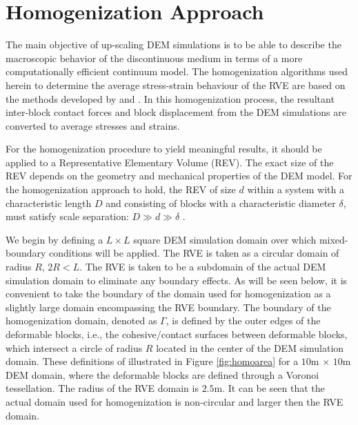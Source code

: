 \section{Homogenization Approach}

The main objective of up-scaling DEM simulations is to be able to describe the macroscopic behavior of the discontinuous medium in terms of a more computationally efficient continuum model. The homogenization algorithms used herein to determine the average stress-strain behaviour of the RVE are based on the methods developed by \citet{daddetta_particle_2004} and \citet{wellmann_homogenization_2008}. In this homogenization process, the resultant inter-block contact forces and block displacement from the DEM simulations are converted to average stresses and strains.

For the homogenization procedure to yield meaningful results, it should be applied to a Representative Elementary Volume (REV). The exact size of the REV depends on the geometry and mechanical properties of the DEM model. For the homogenization approach to hold, the REV of size $d$ within a system with a characteristic length $D$ and consisting of blocks with a characteristic diameter $\delta$, must satisfy scale separation: $D\gg d\gg\delta$ \citep{wellmann_homogenization_2008}. 

We begin by defining a $L\times L$ square DEM simulation domain over which mixed-boundary conditions will be applied. The RVE is taken as a circular domain of radius $R$, $2R<L$.  The RVE is taken to be a subdomain of the actual DEM simulation domain to eliminate any boundary effects.  As will be seen below, it is convenient to take the boundary of the domain used for homogenization as a slightly large domain encompassing the RVE boundary. The boundary of the homogenization domain, denoted as $\Gamma$, is defined by the outer edges of the deformable blocks, i.e., the cohesive/contact surfaces between deformable blocks, which intersect a circle of radius $R$ located in the center of the DEM simulation domain. These definitions of illustrated in Figure \ref{fig:homoarea} for a $10$m $\times$ $10$m DEM domain, where the deformable blocks are defined through a Voronoi tessellation. The radius of the RVE domain is $2.5$m.  It can be seen that the actual domain used for homogenization is non-circular and larger then the RVE domain. 


